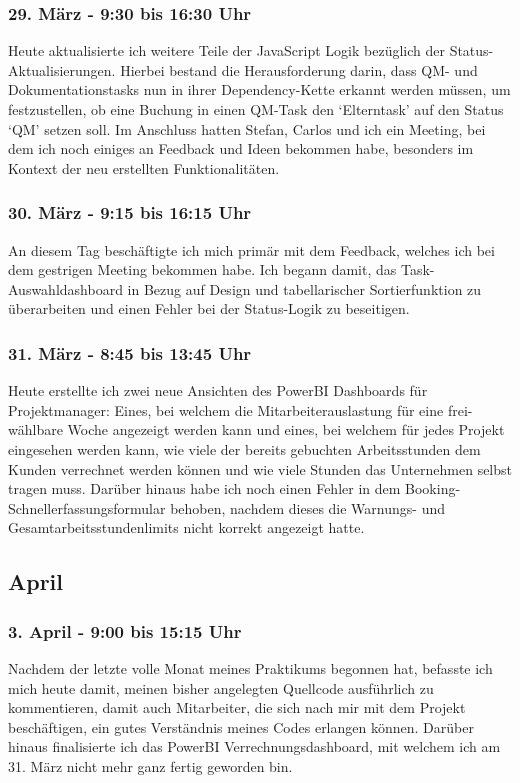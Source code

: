 \subsubsection*{29. März - 9:30 bis 16:30 Uhr}
Heute aktualisierte ich weitere Teile der JavaScript Logik bezüglich der Status-Aktualisierungen. Hierbei bestand die Herausforderung darin, dass QM- und Dokumentationstasks nun in ihrer Dependency-Kette erkannt werden müssen, um festzustellen, ob eine Buchung in einen QM-Task den \enquote*{Elterntask} auf den Status \enquote*{QM} setzen soll. Im Anschluss hatten Stefan, Carlos und ich ein Meeting, bei dem ich noch einiges an Feedback und Ideen bekommen habe, besonders im Kontext der neu erstellten Funktionalitäten.

\subsubsection*{30. März - 9:15 bis 16:15 Uhr}
An diesem Tag beschäftigte ich mich primär mit dem Feedback, welches ich bei dem gestrigen Meeting bekommen habe. Ich begann damit, das Task-Auswahldashboard in Bezug auf Design und tabellarischer Sortierfunktion zu überarbeiten und einen Fehler bei der Status-Logik zu beseitigen.  

\subsubsection*{31. März - 8:45 bis 13:45 Uhr}
Heute erstellte ich zwei neue Ansichten des PowerBI Dashboards für Projektmanager: Eines, bei welchem die Mitarbeiterauslastung für eine frei-wählbare Woche angezeigt werden kann und eines, bei welchem für jedes Projekt eingesehen werden kann, wie viele der bereits gebuchten Arbeitsstunden dem Kunden verrechnet werden können und wie viele Stunden das Unternehmen selbst tragen muss. Darüber hinaus habe ich noch einen Fehler in dem Booking-Schnellerfassungsformular behoben, nachdem dieses die Warnungs- und Gesamtarbeitsstundenlimits nicht korrekt angezeigt hatte.  

\subsection{April}
\subsubsection*{3. April - 9:00 bis 15:15 Uhr}
Nachdem der letzte volle Monat meines Praktikums begonnen hat, befasste ich mich heute damit, meinen bisher angelegten Quellcode ausführlich zu kommentieren, damit auch Mitarbeiter, die sich nach mir mit dem Projekt beschäftigen, ein gutes Verständnis meines Codes erlangen können. Darüber hinaus finalisierte ich das PowerBI Verrechnungsdashboard, mit welchem ich am 31. März nicht mehr ganz fertig geworden bin.

